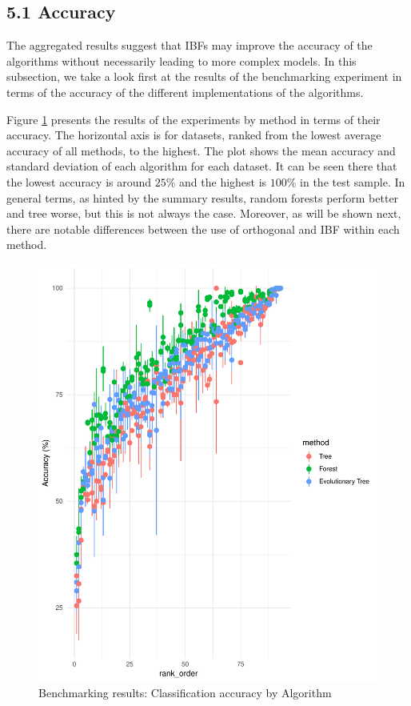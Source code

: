 \documentclass[]{elsarticle} %
\makeatletter
\def\maxwidth{\ifdim\Gin@nat@width>\linewidth\linewidth
\else\Gin@nat@width\fi}
\let\Oldincludegraphics\includegraphics
\renewcommand{\includegraphics}[1]{\Oldincludegraphics[width=\maxwidth]{#1}}
\makeatother
\begin{document}
\subsection{5.1 Accuracy}\label{accuracy}

The aggregated results suggest that IBFs may improve the accuracy of the
algorithms without necessarily leading to more complex models. In this
subsection, we take a look first at the results of the benchmarking
experiment in terms of the accuracy of the different implementations of
the algorithms.

Figure \ref{fig:fig8-performance-algorithm-results} presents the results
of the experiments by method in terms of their accuracy. The horizontal
axis is for datasets, ranked from the lowest average accuracy of all
methods, to the highest. The plot shows the mean accuracy and standard
deviation of each algorithm for each dataset. It can be seen there that
the lowest accuracy is around \(25\)\% and the highest is \(100\)\% in
the test sample. In general terms, as hinted by the summary results,
random forests perform better and tree worse, but this is not always the
case. Moreover, as will be shown next, there are notable differences
between the use of orthogonal and IBF within each method.

\begin{figure}[htbp]
\centering
\includegraphics{Trees_with_Base_Functions_v2_files/figure-latex/fig8-performance-algorithm-results-1.pdf}
\caption{\label{fig:fig8-performance-algorithm-results}Benchmarking
results: Classification accuracy by Algorithm}
\end{figure}
\end{document}
